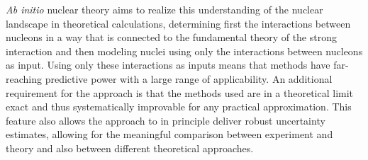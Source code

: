 \textit{Ab initio} nuclear theory aims to realize this understanding of the nuclear landscape
in theoretical calculations,
determining first the interactions between nucleons
in a way that is connected to the fundamental theory of the strong interaction
and then
modeling nuclei using only the interactions between nucleons as input.
Using only these interactions as inputs means that \abinitio{} methods
have far-reaching predictive power with a large range of applicability.
An additional requirement for the \abinitio{} approach is that
the methods used are in a theoretical limit exact
and thus systematically improvable for any practical approximation.
This feature also allows the \abinitio{} approach to in principle deliver robust uncertainty estimates,
allowing for the meaningful comparison between experiment and theory
and also between different \abinitio{} theoretical approaches.

